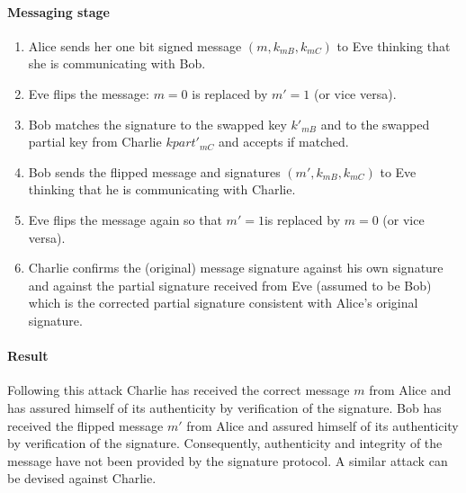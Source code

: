 \documentclass[english]{article}
\begin{document}
\paragraph{Messaging stage}
\begin{enumerate}
\item Alice sends her one bit signed message $\left(m,k_{mB},k_{mC}\right)$
to Eve thinking that she is communicating with Bob.
\item Eve flips the message: $m=0$ is replaced by $m'=1$ (or vice versa).
\item Bob matches the signature to the swapped key $k'_{mB}$ and to the
swapped partial key from Charlie $kpart'_{mC}$ and accepts if matched.
\item Bob sends the flipped message and signatures $\left(m',k_{mB},k_{mC}\right)$
to Eve thinking that he is communicating with Charlie.
\item Eve flips the message again so that $m'=1$is replaced by $m=0$ (or
vice versa).
\item Charlie confirms the (original) message signature against his own
signature and against the partial signature received from Eve (assumed
to be Bob) which is the corrected partial signature consistent with
Alice's original signature.
\end{enumerate}

\paragraph{Result}

Following this attack Charlie has received the correct message $m$
from Alice and has assured himself of its authenticity by verification
of the signature. Bob has received the flipped message $m'$ from
Alice and assured himself of its authenticity by verification of the
signature. Consequently, authenticity and integrity of the message
have not been provided by the signature protocol. A similar attack
can be devised against Charlie.
\end{document}

